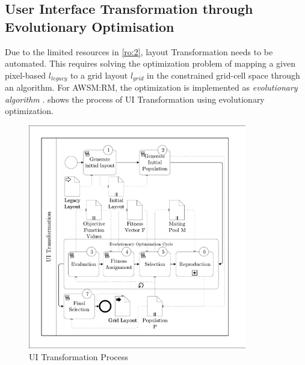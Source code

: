 \vspace{-20pt}
\hypertarget{sec:uitransformation.problem}{%
\subsection[User Interface Transformation through\\ Evolutionary Optimisation]{User Interface Transformation through Evolutionary Optimisation}\label{sec:uitransformation.evolutionary}}
\vspace{20pt}

Due to the limited resources in \cref{ro:2}, layout \gls{Transformation} needs to be automated.
This requires solving the optimization problem of mapping a given pixel-based \(l_{legacy}\) to a grid layout \(l_{grid}\) in the constrained grid-cell space through an algorithm.
For AWSM:RM, the optimization is implemented as \emph{evolutionary algorithm} \autocite{Weise2009Optimization}.
 shows the process of UI Transformation using evolutionary optimization.

\begin{figure}[h!]
\hypertarget{fig:awsm.rm.uitransformation.process}{%
\centering
\includegraphics[width=0.85\textwidth]{../figures/awsm-rm-UITransformation-BPMN.pdf}
\caption{UI Transformation Process}\label{fig:awsm.rm.uitransformation.process}
}
\end{figure}

